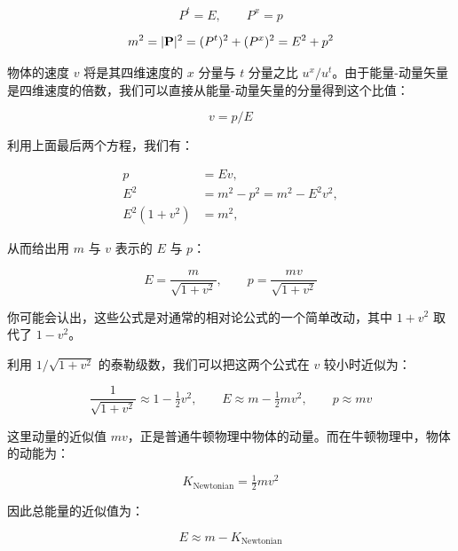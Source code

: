 \begin{equation}
P^{t} = E, \qquad P^{x} = p
\end{equation}

\begin{equation}
m^{2} = |\mathbf{P}|^{2} = (P^{t})^{2} + (P^{x})^{2} = E^{2} + p^{2}
\end{equation}

物体的速度 $v$ 将是其四维速度的 $x$ 分量与 $t$ 分量之比 $u^{x}/u^{t}$。由于能量-动量矢量是四维速度的倍数，我们可以直接从能量-动量矢量的分量得到这个比值：

\begin{equation}
v = p/E
\end{equation}

利用上面最后两个方程，我们有：

\begin{align}
p &= Ev,\\
E^{2} &= m^{2} - p^{2} = m^{2} - E^{2}v^{2},\\
E^{2}(1 + v^{2}) &= m^{2},
\end{align}

从而给出用 $m$ 与 $v$ 表示的 $E$ 与 $p$：

\begin{equation}
E = \frac{m}{\sqrt{1+v^{2}}}, \qquad p = \frac{mv}{\sqrt{1+v^{2}}}
\end{equation}

你可能会认出，这些公式是对通常的相对论公式的一个简单改动，其中 $1+v^{2}$ 取代了 $1-v^{2}$。

利用 $1/\sqrt{1+v^{2}}$ 的泰勒级数，我们可以把这两个公式在 $v$ 较小时近似为：

\begin{equation}
\frac{1}{\sqrt{1+v^{2}}} \approx 1 - \tfrac{1}{2}v^{2},
\qquad
E \approx m - \tfrac{1}{2}mv^{2},
\qquad
p \approx mv
\end{equation}


这里动量的近似值 $mv$，正是普通牛顿物理中物体的动量。而在牛顿物理中，物体的动能为：

\begin{equation}
K_{\text{Newtonian}} = \tfrac{1}{2}mv^{2}
\end{equation}

因此总能量的近似值为：

\begin{equation}
E \approx m - K_{\text{Newtonian}}
\end{equation}


